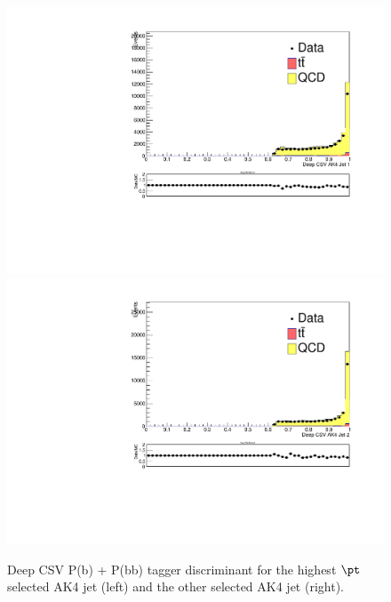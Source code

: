 \begin{figure}[h]
\begin{center}
\includegraphics[scale=0.34]{Figures/ratMCbtag1.pdf}
\includegraphics[scale=0.34]{Figures/ratMCbtag2.pdf}
\end{center}
\caption{Deep CSV P(b) + P(bb) tagger discriminant for the highest $\pt$ selected AK4 jet (left) and the other selected AK4 jet (right).}
\label{fig:dMCAK4btag}
\end{figure} 

